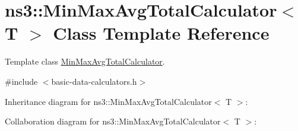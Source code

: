 \hypertarget{classns3_1_1MinMaxAvgTotalCalculator}{}\section{ns3\+:\+:Min\+Max\+Avg\+Total\+Calculator$<$ T $>$ Class Template Reference}
\label{classns3_1_1MinMaxAvgTotalCalculator}


Template class \hyperlink{classns3_1_1MinMaxAvgTotalCalculator}{Min\+Max\+Avg\+Total\+Calculator}.  




{\ttfamily \#include $<$basic-\/data-\/calculators.\+h$>$}



Inheritance diagram for ns3\+:\+:Min\+Max\+Avg\+Total\+Calculator$<$ T $>$\+:


Collaboration diagram for ns3\+:\+:Min\+Max\+Avg\+Total\+Calculator$<$ T $>$\+:
